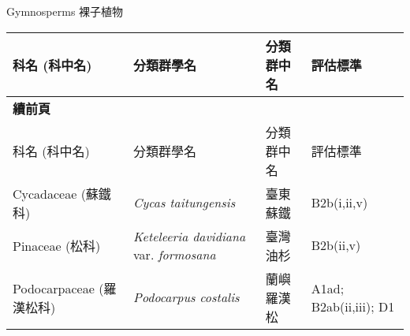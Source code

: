 \noindent\normalfont\selectfont Gymnosperms 裸子植物
\footnotesize\selectfont
        \begin{longtable}{p{3cm}p{5cm}p{3cm}p{4cm}}
        \toprule
          科名 (科中名) & 分類群學名 & 分類群中名 & 評估標準 \\
        \midrule 
        \endfirsthead

        {{\bfseries 續前頁 }} \\
        科名 (科中名) & 分類群學名 & 分類群中名 & 評估標準 \\
        \midrule
        \endhead
                Cycadaceae (蘇鐵科) & \textit{Cycas taitungensis}  & 臺東蘇鐵 & B2b(i,ii,v) \index{Cycas@\textit{Cycas}!taitungensis@\textit{taitungensis}}  \index{臺東蘇鐵} \\
    Pinaceae (松科) & \textit{Keteleeria davidiana} var. \textit{formosana}  & 臺灣油杉 & B2b(ii,v) \index{Keteleeria@\textit{Keteleeria}!davidiana@\textit{davidiana}!var. formosana@var. \textit{formosana}}  \index{臺灣油杉} \\
    Podocarpaceae (羅漢松科) & \textit{Podocarpus costalis}  & 蘭嶼羅漢松 & A1ad; B2ab(ii,iii); D1 \index{Podocarpus@\textit{Podocarpus}!costalis@\textit{costalis}}  \index{蘭嶼羅漢松} \\
    \bottomrule
        \end{longtable}
